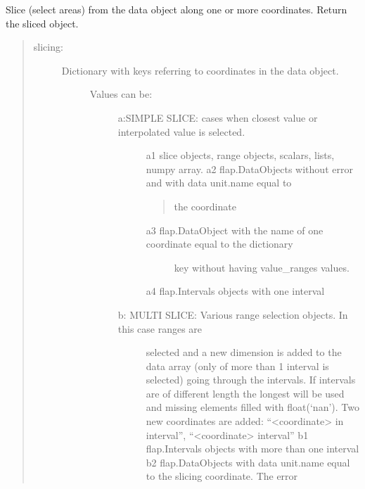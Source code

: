 \documentclass[letterpaper,10pt,english]{sphinxmanual}
\begin{document}
\begin{fulllineitems}
\begin{fulllineitems}
\label{\detokenize{data_object:flap.data_object.DataObject.slice_data}}
Slice (select areas) from the data object along one or more coordinates.
Return the sliced object.
\begin{quote}
\begin{description}
\item[{slicing:}] \leavevmode\begin{description}
\item[{Dictionary with keys referring to coordinates in the data object.}] \leavevmode\begin{description}
\item[{Values can be:}] \leavevmode\begin{description}
\item[{a:SIMPLE SLICE: cases when closest value or interpolated value is selected.}] \leavevmode
a1 slice objects, range objects, scalars, lists, numpy array.
a2 flap.DataObjects without error and with data unit.name equal to
\begin{quote}

the coordinate
\end{quote}
\begin{description}
\item[{a3 flap.DataObject with the name of one coordinate equal to the dictionary}] \leavevmode
key without having value\_ranges values.

\end{description}

a4 flap.Intervals objects with one interval

\item[{b: MULTI SLICE: Various range selection objects. In this case ranges are}] \leavevmode
selected and a new dimension is added to the data array
(only of more than 1 interval is selected) going through the
intervals. If intervals are of different length the longest will be used
and missing elements filled with float(‘nan’).
Two new coordinates are added: “\textless{}coordinate\textgreater{} in interval”,
“\textless{}coordinate\textgreater{} interval”
b1 flap.Intervals objects with more than one interval
b2 flap.DataObjects with data unit.name equal to the slicing coordinate. The error
\begin{quote}


\end{quote}
\end{description}
\end{description}
\end{description}
\end{description}
\end{quote}
\end{fulllineitems}
\end{fulllineitems}
\end{document}
